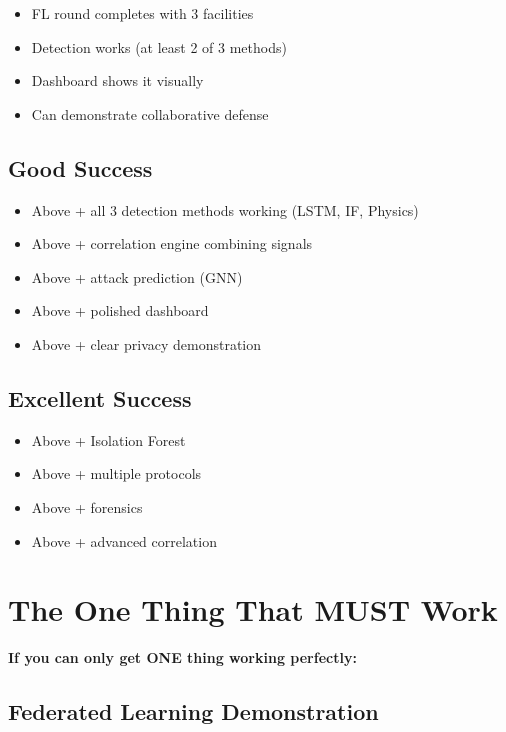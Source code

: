 \documentclass[11pt,a4paper]{article}
\begin{document}
\begin{itemize}[leftmargin=*]
    \item FL round completes with 3 facilities
    \item Detection works (at least 2 of 3 methods)
    \item Dashboard shows it visually
    \item Can demonstrate collaborative defense
\end{itemize}

\subsection{Good Success}

\begin{itemize}[leftmargin=*]
    \item Above + all 3 detection methods working (LSTM, IF, Physics)
    \item Above + correlation engine combining signals
    \item Above + attack prediction (GNN)
    \item Above + polished dashboard
    \item Above + clear privacy demonstration
\end{itemize}

\subsection{Excellent Success}

\begin{itemize}[leftmargin=*]
    \item Above + Isolation Forest
    \item Above + multiple protocols
    \item Above + forensics
    \item Above + advanced correlation
\end{itemize}

\section{The One Thing That MUST Work}

\textbf{If you can only get ONE thing working perfectly:}

\subsection{Federated Learning Demonstration}
\end{document}
